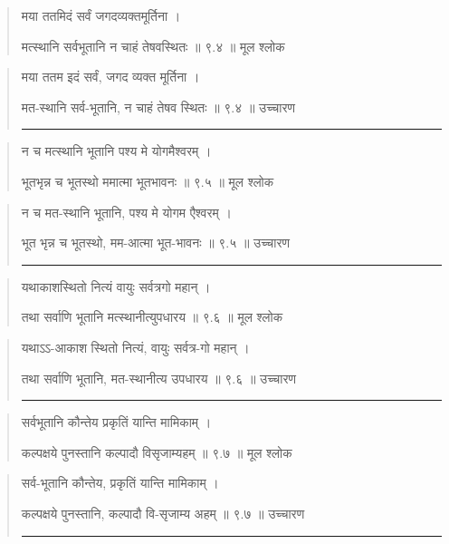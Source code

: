 \begin{quotation} 

मया ततमिदं सर्वं जगदव्यक्तमूर्तिना  ।  

मत्स्थानि सर्वभूतानि न चाहं तेषवस्थितः  ॥ ९.४ ॥  मूल श्लोक
\end{quotation}

\begin{quotation}

मया ततम इदं सर्वं, जगद व्यक्त मूर्तिना  ।  

मत-स्थानि सर्व-भूतानि, न चाहं तेषव स्थितः  ॥ ९.४ ॥  उच्चारण

\noindent\rule{16cm}{0.4pt} 
\end{quotation}


\begin{quotation} 

न च मत्स्थानि भूतानि पश्य मे योगमैश्वरम्‌  ।  

भूतभृन्न च भूतस्थो ममात्मा भूतभावनः  ॥ ९.५ ॥  मूल श्लोक
\end{quotation}

\begin{quotation}

न च मत-स्थानि भूतानि, पश्य मे योगम एैश्वरम्‌  ।  

भूत भृन्न च भूतस्थो, मम-आत्मा भूत-भावनः  ॥ ९.५ ॥  उच्चारण

\noindent\rule{16cm}{0.4pt} 
\end{quotation}


\begin{quotation} 
यथाकाशस्थितो नित्यं वायुः सर्वत्रगो महान्‌  ।  

तथा सर्वाणि भूतानि मत्स्थानीत्युपधारय  ॥ ९.६ ॥  मूल श्लोक
\end{quotation}

\begin{quotation}

यथाऽऽ-आकाश स्थितो नित्यं, वायुः सर्वत्र-गो महान्‌  ।  

तथा सर्वाणि भूतानि, मत-स्थानीत्य उपधारय  ॥ ९.६ ॥  उच्चारण

\noindent\rule{16cm}{0.4pt} 
\end{quotation}


\begin{quotation} 

सर्वभूतानि कौन्तेय प्रकृतिं यान्ति मामिकाम्‌  ।  

कल्पक्षये पुनस्तानि कल्पादौ विसृजाम्यहम्‌  ॥ ९.७ ॥  मूल श्लोक
\end{quotation}

\begin{quotation}

सर्व-भूतानि कौन्तेय, प्रकृतिं यान्ति मामिकाम्‌  ।  

कल्पक्षये पुनस्तानि, कल्पादौ वि-सृजाम्य अहम्‌  ॥ ९.७ ॥  उच्चारण

\noindent\rule{16cm}{0.4pt} 
\end{quotation}


